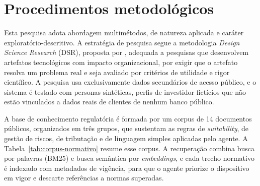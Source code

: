 
\section{Procedimentos metodológicos}

Esta pesquisa adota abordagem multimétodos, de natureza aplicada e caráter
exploratório-descritivo. A estratégia de pesquisa segue a metodologia
\textit{Design Science Research} (DSR), proposta por ,
adequada a pesquisas que desenvolvem artefatos tecnológicos com impacto
organizacional, por exigir que o artefato resolva um problema real e seja
avaliado por critérios de utilidade e rigor científico. A pesquisa usa
exclusivamente dados secundários de acesso público, e o sistema é testado com
personas sintéticas, perfis de investidor fictícios que não estão vinculados a
dados reais de clientes de nenhum banco público.

A base de conhecimento regulatória é formada por um corpus de 14 documentos
públicos, organizados em três grupos, que sustentam as regras de
\textit{suitability}, de gestão de riscos, de tributação e de linguagem simples
aplicadas pelo agente. A Tabela~\ref{tab:corpus-normativo} resume esse corpus.
A recuperação combina busca por palavras (BM25) e busca semântica por
\textit{embeddings}, e cada trecho normativo é indexado com metadados de
vigência, para que o agente priorize o dispositivo em vigor e descarte
referências a normas superadas.

